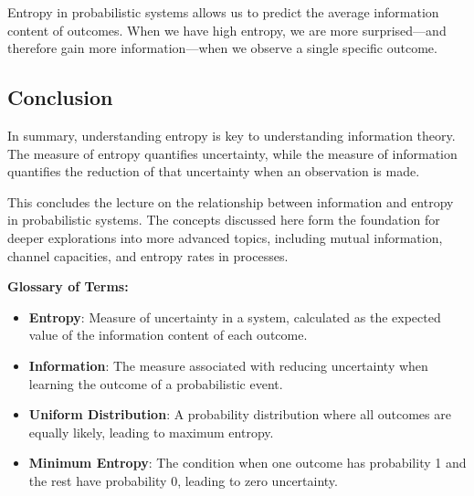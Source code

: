\documentclass[12pt,a4paper]{article}
\begin{document}
Entropy in probabilistic systems allows us to predict the average information content of outcomes. When we have high entropy, we are more surprised—and therefore gain more information—when we observe a single specific outcome.

\subsection*{Conclusion}

In summary, understanding entropy is key to understanding information theory. The measure of entropy quantifies uncertainty, while the measure of information quantifies the reduction of that uncertainty when an observation is made.

This concludes the lecture on the relationship between information and entropy in probabilistic systems. The concepts discussed here form the foundation for deeper explorations into more advanced topics, including mutual information, channel capacities, and entropy rates in processes.

\vspace{10pt} 
\noindent \textbf{Glossary of Terms:}
\begin{itemize}
    \item \textbf{Entropy}: Measure of uncertainty in a system, calculated as the expected value of the information content of each outcome.
    \item \textbf{Information}: The measure associated with reducing uncertainty when learning the outcome of a probabilistic event.
    \item \textbf{Uniform Distribution}: A probability distribution where all outcomes are equally likely, leading to maximum entropy.
    \item \textbf{Minimum Entropy}: The condition when one outcome has probability 1 and the rest have probability 0, leading to zero uncertainty.
\end{itemize}
\end{document}
